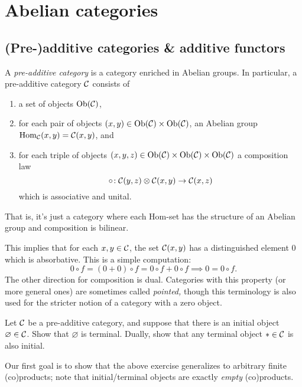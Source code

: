 
\section{Abelian categories}
\subsection{(Pre-)additive categories \& additive functors}
\begin{definition}
	A \emph{pre-additive category} is a category enriched in Abelian groups. In particular, a pre-additive category \(\mathcal{C}\) consists of
	\begin{enumerate}[label=(\arabic*)]
	\item a set of objects \(\operatorname{Ob}(\mathcal{C})\),
	\item for each pair of objects \((x,y)\in\operatorname{Ob}(\mathcal{C})\times\operatorname{Ob}(\mathcal{C})\), an Abelian group \(\operatorname{Hom}_{\mathcal{C}}(x,y) = \mathcal{C}(x,y)\), and
	\item for each triple of objects \((x,y,z)\in \operatorname{Ob}(\mathcal{C})\times \operatorname{Ob}(\mathcal{C})\times \operatorname{Ob}(\mathcal{C})\) a composition law
	\[ \circ\!:\mathcal{C}(y,z)\otimes\mathcal{C}(x,y)\to\mathcal{C}(x,z) \]
	which is associative and unital.
	\end{enumerate}
	That is, it's just a category where each Hom-set has the structure of an Abelian group and composition is bilinear.
\end{definition}
\begin{remark}
	This implies that for each \(x,y\in\mathcal{C}\), the set \(\mathcal{C}(x,y)\) has a distinguished element \(0\) which is absorbative. This is a simple
	computation:
	\[ 0\circ f = (0+0)\circ f = 0\circ f + 0\circ f \implies 0 = 0\circ f. \]
	The other direction for composition is dual. Categories with this property (or more general ones) are sometimes called \emph{pointed,} though this terminology
	is also used for the stricter notion of a category with a zero object.
\end{remark}

\begin{exercise}
	Let \(\mathcal{C}\) be a pre-additive category, and suppose that there is an initial object \(\varnothing\in\mathcal{C}\). Show that \(\varnothing\) is terminal.
	Dually, show that any terminal object \(*\in\mathcal{C}\) is also initial.
\end{exercise}

Our first goal is to show that the above exercise generalizes to arbitrary finite (co)products; note that initial/terminal objects are exactly \emph{empty} (co)products.


